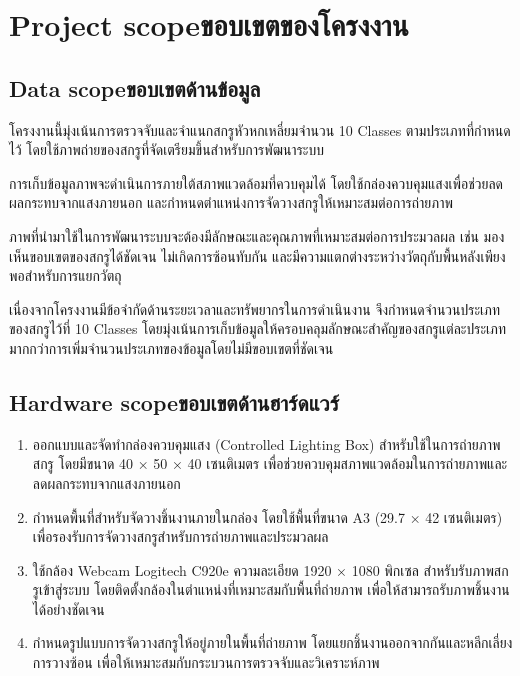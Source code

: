 \section{\ifenglish Project scope\else ขอบเขตของโครงงาน\fi}

\subsection{\ifenglish Data scope\else ขอบเขตด้านข้อมูล\fi}

โครงงานนี้มุ่งเน้นการตรวจจับและจำแนกสกรูหัวหกเหลี่ยมจำนวน 10 Classes ตามประเภทที่กำหนดไว้ โดยใช้ภาพถ่ายของสกรูที่จัดเตรียมขึ้นสำหรับการพัฒนาระบบ

การเก็บข้อมูลภาพจะดำเนินการภายใต้สภาพแวดล้อมที่ควบคุมได้ โดยใช้กล่องควบคุมแสงเพื่อช่วยลดผลกระทบจากแสงภายนอก และกำหนดตำแหน่งการจัดวางสกรูให้เหมาะสมต่อการถ่ายภาพ

ภาพที่นำมาใช้ในการพัฒนาระบบจะต้องมีลักษณะและคุณภาพที่เหมาะสมต่อการประมวลผล เช่น มองเห็นขอบเขตของสกรูได้ชัดเจน ไม่เกิดการซ้อนทับกัน และมีความแตกต่างระหว่างวัตถุกับพื้นหลังเพียงพอสำหรับการแยกวัตถุ

เนื่องจากโครงงานมีข้อจำกัดด้านระยะเวลาและทรัพยากรในการดำเนินงาน จึงกำหนดจำนวนประเภทของสกรูไว้ที่ 10 Classes โดยมุ่งเน้นการเก็บข้อมูลให้ครอบคลุมลักษณะสำคัญของสกรูแต่ละประเภท มากกว่าการเพิ่มจำนวนประเภทของข้อมูลโดยไม่มีขอบเขตที่ชัดเจน

\subsection{\ifenglish Hardware scope\else ขอบเขตด้านฮาร์ดแวร์\fi}

\begin{enumerate}                                        
    \item ออกแบบและจัดทำกล่องควบคุมแสง (Controlled Lighting Box) สำหรับใช้ในการถ่ายภาพสกรู โดยมีขนาด 40 × 50 × 40 เซนติเมตร เพื่อช่วยควบคุมสภาพแวดล้อมในการถ่ายภาพและลดผลกระทบจากแสงภายนอก
    \item กำหนดพื้นที่สำหรับจัดวางชิ้นงานภายในกล่อง โดยใช้พื้นที่ขนาด A3 (29.7 × 42 เซนติเมตร) เพื่อรองรับการจัดวางสกรูสำหรับการถ่ายภาพและประมวลผล
    \item ใช้กล้อง Webcam Logitech C920e ความละเอียด 1920 × 1080 พิกเซล สำหรับรับภาพสกรูเข้าสู่ระบบ โดยติดตั้งกล้องในตำแหน่งที่เหมาะสมกับพื้นที่ถ่ายภาพ เพื่อให้สามารถรับภาพชิ้นงานได้อย่างชัดเจน \cite{logitechC920e}
    \item กำหนดรูปแบบการจัดวางสกรูให้อยู่ภายในพื้นที่ถ่ายภาพ โดยแยกชิ้นงานออกจากกันและหลีกเลี่ยงการวางซ้อน เพื่อให้เหมาะสมกับกระบวนการตรวจจับและวิเคราะห์ภาพ
\end{enumerate}

